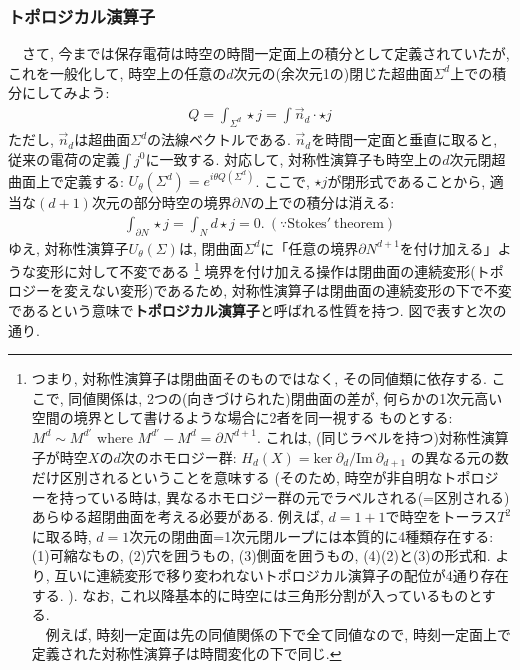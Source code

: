 \documentclass{ltjsarticle}
\theoremstyle{mystyle} %
\numberwithin{equation}{section}
\begin{document}
    \subsubsection{トポロジカル演算子}
    　さて, 今までは保存電荷は時空の時間一定面上の積分として定義されていたが, 
    これを一般化して, 時空上の任意の$d$次元の(余次元1の)閉じた超曲面$\Sigma^d$上での積分にしてみよう: 
    \begin{align}
        Q=\int_{\Sigma^d} \star j
        =\int \vec{n}_d \cdot \star j 
    \end{align}
    ただし, $\vec{n}_d$は超曲面$\Sigma^d$の法線ベクトルである. 
    $\vec{n}_d$を時間一定面と垂直に取ると, 従来の電荷の定義$\int j^{0}$に一致する. 
    対応して, 対称性演算子も時空上の$d$次元閉超曲面上で定義する: 
    $U_\theta(\Sigma^d)=e^{i\theta Q(\Sigma^d)}$. 
    ここで, $\star j$が閉形式であることから, 適当な$(d+1)$次元の部分時空の境界$\partial N$の上での積分は消える: 
    \begin{align}
        \int_{\partial N} \star j = \int_{N} d\star j = 0. ~ (\because \mathrm{Stokes'~theorem})
    \end{align}
ゆえ, 対称性演算子$U_\theta(\Sigma)$は, 閉曲面$\Sigma^d$に「任意の境界$\partial N^{d+1}$を付け加える」ような変形に対して不変である
\footnote{つまり, 対称性演算子は閉曲面そのものではなく, その同値類に依存する. 
ここで, 同値関係は, 2つの(向きづけられた)閉曲面の差が, 何らかの1次元高い空間の境界として書けるような場合に2者を同一視する
ものとする: $M^d \sim M^{d'}$ where $M^{d'}-M^d = \partial N^{d+1}$. 
これは, (同じラベルを持つ)対称性演算子が時空$X$の$d$次のホモロジー群: $H_{d}(X)=\mathrm{ker}~\partial_d/\mathrm{Im}~\partial_{d+1}$
の異なる元の数だけ区別されるということを意味する
(そのため, 時空が非自明なトポロジーを持っている時は, 異なるホモロジー群の元でラベルされる(=区別される)あらゆる超閉曲面を考える必要がある. 
例えば, $d=1+1$で時空をトーラス$T^2$に取る時, 
$d=1$次元の閉曲面=1次元閉ループには本質的に4種類存在する: 
(1)可縮なもの, (2)穴を囲うもの, (3)側面を囲うもの, (4)(2)と(3)の形式和. 
より, 互いに連続変形で移り変われないトポロジカル演算子の配位が4通り存在する. ). 
なお, これ以降基本的に時空には三角形分割が入っているものとする. \\
　例えば, 時刻一定面は先の同値関係の下で全て同値なので, 
時刻一定面上で定義された対称性演算子は時間変化の下で同じ. 
}
境界を付け加える操作は閉曲面の連続変形(トポロジーを変えない変形)であるため, 
対称性演算子は閉曲面の連続変形の下で不変であるという意味で\textbf{トポロジカル演算子}と呼ばれる性質を持つ. 
図で表すと次の通り. \\
\end{document}
